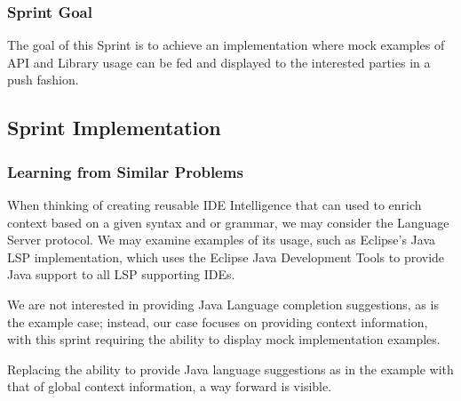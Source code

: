 \subsubsection{Sprint  Goal}

The goal of this Sprint is to achieve an implementation where mock examples of API and Library usage can be fed and displayed to the interested parties in a push fashion.

\subsection{Sprint Implementation}

\subsubsection{Learning from Similar Problems}

When thinking of creating reusable IDE Intelligence that can used to enrich context based on a given syntax and or grammar, we may consider the Language Server protocol. We may examine examples of its usage, such as Eclipse's Java LSP implementation, which uses the Eclipse Java Development Tools to provide Java support to all LSP supporting IDEs.

\begin{figure}[h!]


\end{figure}

We are not interested in providing Java Language completion suggestions, as is the example case; instead, our case focuses on providing context information, with this sprint requiring the ability to display mock implementation examples.

Replacing the ability to provide Java language suggestions as in the example with that of global context information, a way forward is visible.

\begin{figure}[h!]
	

\end{figure}


